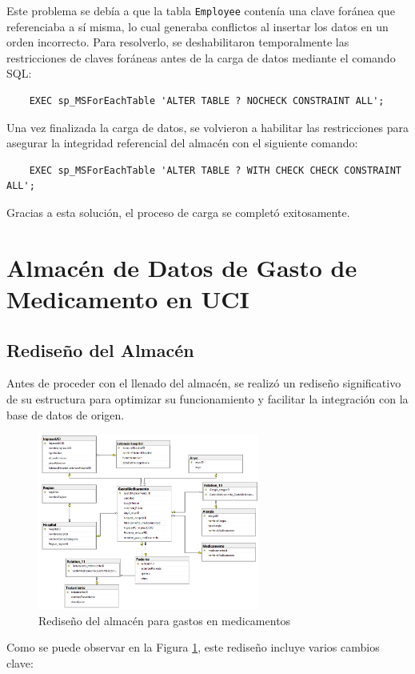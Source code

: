 \documentclass{article}
\begin{document}
Este problema se debía a que la tabla \texttt{Employee} contenía una clave foránea que referenciaba a sí misma, lo cual generaba conflictos al insertar los datos en un orden incorrecto. Para resolverlo, se deshabilitaron temporalmente las restricciones de claves foráneas antes de la carga de datos mediante el comando SQL:

\begin{verbatim}
	EXEC sp_MSForEachTable 'ALTER TABLE ? NOCHECK CONSTRAINT ALL';
\end{verbatim}

Una vez finalizada la carga de datos, se volvieron a habilitar las restricciones para asegurar la integridad referencial del almacén con el siguiente comando:

\begin{verbatim}
	EXEC sp_MSForEachTable 'ALTER TABLE ? WITH CHECK CHECK CONSTRAINT ALL';
\end{verbatim}

Gracias a esta solución, el proceso de carga se completó exitosamente. 

\section{Almacén de Datos de Gasto de Medicamento en UCI}

\subsection{Rediseño del Almacén}

Antes de proceder con el llenado del almacén, se realizó un rediseño significativo de su estructura para optimizar su funcionamiento y facilitar la integración con la base de datos de origen. 
\begin{figure}[H]
	\begin{center} 
		\includegraphics[width=0.65\textwidth]{images/nuevo_diseno.png} %
		\caption{Rediseño del almacén para gastos en medicamentos}
		\label{fig:nuevo_diseño}
	\end{center}
\end{figure}
Como se puede observar en la Figura \ref{fig:nuevo_diseño}, este rediseño incluye varios cambios clave:
\end{document}
